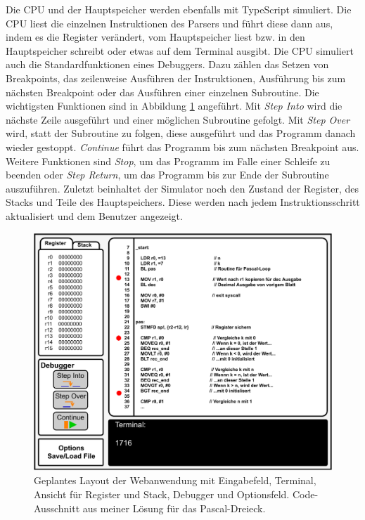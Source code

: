 \documentclass[a4paper, 11pt, onecolumn]{article}
\begin{document}
Die CPU und der Hauptspeicher werden ebenfalls mit TypeScript simuliert. Die CPU liest die einzelnen Instruktionen des Parsers und führt diese dann aus, indem es die Register verändert, vom Hauptspeicher liest bzw. in den Hauptspeicher schreibt oder etwas auf dem Terminal ausgibt. Die CPU simuliert auch die Standardfunktionen eines Debuggers. Dazu zählen das Setzen von Breakpoints, das zeilenweise Ausführen der Instruktionen, Ausführung bis zum nächsten Breakpoint oder das Ausführen einer einzelnen Subroutine. Die wichtigsten Funktionen sind in Abbildung \ref{layout} angeführt. Mit \textit{Step Into} wird die nächste Zeile ausgeführt und einer möglichen Subroutine gefolgt. Mit \textit{Step Over} wird, statt der Subroutine zu folgen, diese ausgeführt und das Programm danach wieder gestoppt. \textit{Continue} führt das Programm bis zum nächsten Breakpoint aus. Weitere Funktionen sind \textit{Stop}, um das Programm im Falle einer Schleife zu beenden oder \textit{Step Return}, um das Programm bis zur Ende der Subroutine auszuführen. Zuletzt beinhaltet der Simulator noch den Zustand der Register, des Stacks und Teile des Hauptspeichers. Diese werden nach jedem Instruktionsschritt aktualisiert und dem Benutzer angezeigt.

\begin{figure}[!htb]	
	\includegraphics[width=0.8\paperwidth]{data/layout}
	\caption{Geplantes Layout der Webanwendung mit Eingabefeld, Terminal, Ansicht für Register und Stack, Debugger und Optionsfeld. Code-Ausschnitt aus meiner Lösung für das Pascal-Dreieck.}
	\label{layout}
\end{figure}
\end{document}
